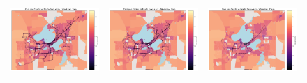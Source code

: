 \documentclass[letter]{article}
\begin{document}
\begin{figure}
\begin{center}
\begin{tabular}{ c c c }

  \includegraphics[width=60mm]{CarOwnershipVSfrequency7am.png}   & \includegraphics[width=60mm]{CarOwnershipVSfrequency2pm.png}  & \includegraphics[width=60mm]{CarOwnershipVSfrequency11pm.png}  \\

          \end{tabular}
\end{center}
\end{figure}
\end{document}
